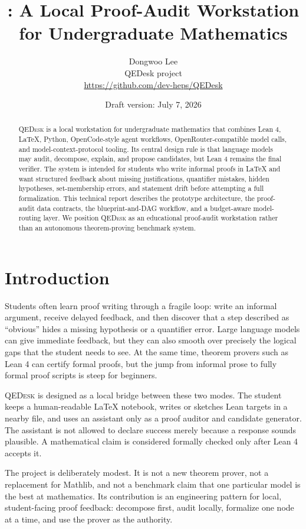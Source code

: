 \documentclass[11pt]{article}
\title{\qedesk: A Local Proof-Audit Workstation for Undergraduate Mathematics}
\author{
  Dongwoo Lee\\
  \small QEDesk project\\
  \small \url{https://github.com/dev-heps/QEDesk}
}
\date{Draft version: July 7, 2026}
\newcommand{\qedesk}{\textsc{QEDesk}}
\newcommand{\lean}{Lean 4}
\newcommand{\mathlib}{Mathlib}
\begin{document}
\maketitle

\begin{abstract}
\qedesk{} is a local workstation for undergraduate mathematics that combines
\lean{}, LaTeX, Python, OpenCode-style agent workflows, OpenRouter-compatible
model calls, and model-context-protocol tooling.  Its central design rule is
that language models may audit, decompose, explain, and propose candidates, but
\lean{} remains the final verifier.  The system is intended for students who
write informal proofs in LaTeX and want structured feedback about missing
justifications, quantifier mistakes, hidden hypotheses, set-membership errors,
and statement drift before attempting a full formalization.  This technical
report describes the prototype architecture, the proof-audit data contracts,
the blueprint-and-DAG workflow, and a budget-aware model-routing layer.  We
position \qedesk{} as an educational proof-audit workstation rather than an
autonomous theorem-proving benchmark system.
\end{abstract}

\section{Introduction}

Students often learn proof writing through a fragile loop: write an informal
argument, receive delayed feedback, and then discover that a step described as
``obvious'' hides a missing hypothesis or a quantifier error.  Large language
models can give immediate feedback, but they can also smooth over precisely the
logical gaps that the student needs to see.  At the same time, theorem provers
such as \lean{} can certify formal proofs, but the jump from informal prose to
fully formal proof scripts is steep for beginners.

\qedesk{} is designed as a local bridge between these two modes.  The student
keeps a human-readable LaTeX notebook, writes or sketches Lean targets in a
nearby file, and uses an assistant only as a proof auditor and candidate
generator.  The assistant is not allowed to declare success merely because a
response sounds plausible.  A mathematical claim is considered formally checked
only after \lean{} accepts it.

The project is deliberately modest.  It is not a new theorem prover, not a
replacement for \mathlib{}, and not a benchmark claim that one particular model
is the best at mathematics.  Its contribution is an engineering pattern for
local, student-facing proof feedback: decompose first, audit locally, formalize
one node at a time, and use the prover as the authority.
\end{document}
